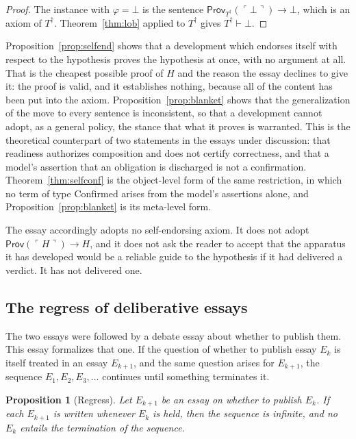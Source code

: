 \documentclass[11pt]{article}
\theoremstyle{plain}
\newtheorem{proposition}[theorem]{Proposition}
\theoremstyle{definition}
\theoremstyle{remark}
\newcommand{\Hyp}{H}
\newcommand{\prov}{\mathsf{Prov}}
\begin{document}
\begin{proof}
The instance with $\varphi=\bot$ is the sentence $\prov_{T^{\dagger}}(\ulcorner\bot\urcorner)\to\bot$, which is an axiom of $T^{\dagger}$. Theorem~\ref{thm:lob} applied to $T^{\dagger}$ gives $T^{\dagger}\vdash\bot$. \qedhere
\end{proof}

Proposition~\ref{prop:selfend} shows that a development which endorses itself with respect to the hypothesis proves the hypothesis at once, with no argument at all. That is the cheapest possible proof of $\Hyp$ and the reason the essay declines to give it: the proof is valid, and it establishes nothing, because all of the content has been put into the axiom. Proposition~\ref{prop:blanket} shows that the generalization of the move to every sentence is inconsistent, so that a development cannot adopt, as a general policy, the stance that what it proves is warranted. This is the theoretical counterpart of two statements in the essays under discussion: that readiness authorizes composition and does not certify correctness, and that a model's assertion that an obligation is discharged is not a confirmation. Theorem~\ref{thm:selfconf} is the object-level form of the same restriction, in which no term of type $\mathrm{Confirmed}$ arises from the model's assertions alone, and Proposition~\ref{prop:blanket} is its meta-level form.

The essay accordingly adopts no self-endorsing axiom. It does not adopt $\prov(\ulcorner\Hyp\urcorner)\to\Hyp$, and it does not ask the reader to accept that the apparatus it has developed would be a reliable guide to the hypothesis if it had delivered a verdict. It has not delivered one.

\subsection{The regress of deliberative essays}

The two essays were followed by a debate essay about whether to publish them. This essay formalizes that one. If the question of whether to publish essay $E_k$ is itself treated in an essay $E_{k+1}$, and the same question arises for $E_{k+1}$, the sequence $E_1,E_2,E_3,\ldots$ continues until something terminates it.

\begin{proposition}[Regress]\label{prop:regress}
Let $E_{k+1}$ be an essay on whether to publish $E_k$. If each $E_{k+1}$ is written whenever $E_k$ is held, then the sequence is infinite, and no $E_k$ entails the termination of the sequence.
\end{proposition}
\end{document}
